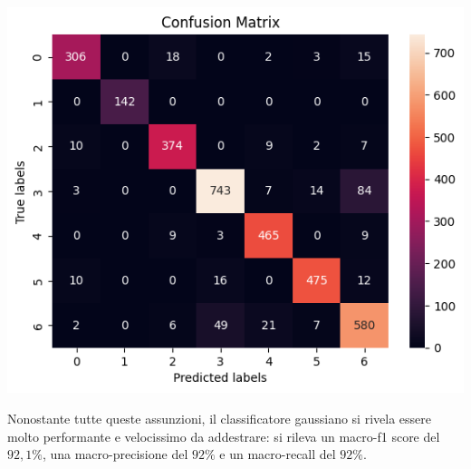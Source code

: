 \begin{Figure}
    \centering
    \includegraphics[width=\linewidth]{img/gnb_confusion_matrix.png}
\end{Figure}

Nonostante tutte queste assunzioni, il classificatore gaussiano si rivela essere
molto performante e velocissimo da addestrare:
si rileva un macro-f1 score del $92,1\%$, 
una macro-precisione del $92\%$ e un macro-recall del $92\%$.
